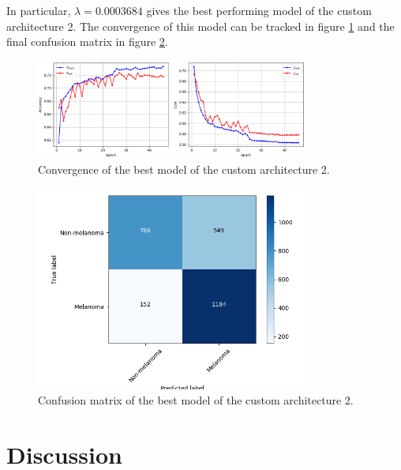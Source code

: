 In particular, $\lambda = 0.0003684$ gives the best performing model of the custom architecture 2. The convergence of this model can be tracked in figure \ref{fig:custom2_best_training} and the final confusion matrix in figure \ref{fig:custom2_best_confusionmatrix}.

\begin{figure}[ht]
    \centering
    \includegraphics[width=0.8\textwidth]{figs/custom2_best_training.png}
    \caption{Convergence of the best model of the custom architecture 2.}
    \label{fig:custom2_best_training}
\end{figure}

\begin{figure}[ht]
    \centering
    \includegraphics[width=0.8\textwidth]{figs/custom2_best_confusionmatrix.png}
    \caption{Confusion matrix of the best model of the custom architecture 2.}
    \label{fig:custom2_best_confusionmatrix}
\end{figure}

\section{Discussion}



